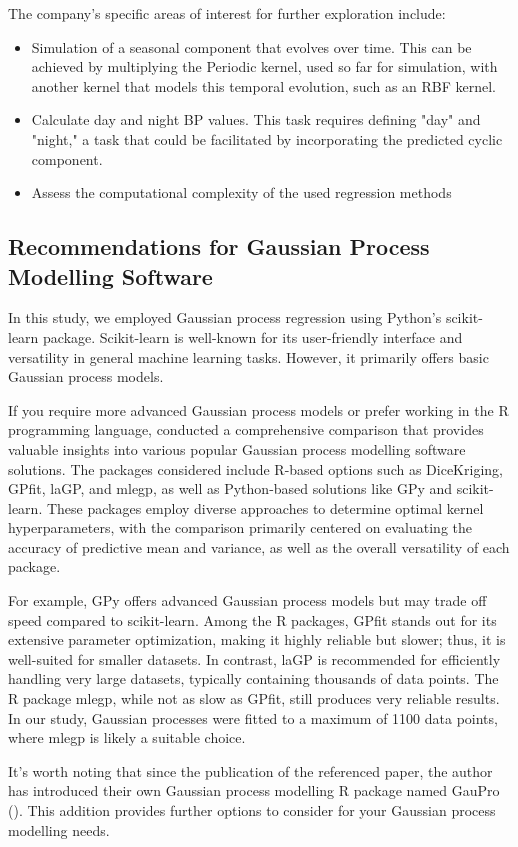 The company's specific areas of interest for further exploration include:

\begin{itemize}
    \item Simulation of a seasonal component that evolves over time.
    This can be achieved by multiplying the Periodic kernel, used so far for simulation,
    with another kernel that models this temporal evolution, such as an RBF kernel.

    \item Calculate day and night BP values. This task requires defining "day" and "night," a task that could be
    facilitated by incorporating the predicted cyclic component.

    \item Assess the computational complexity of the used regression methods

\end{itemize}


\subsection{Recommendations for Gaussian Process Modelling Software}

In this study, we employed Gaussian process regression using Python's scikit-learn package.
Scikit-learn is well-known for its user-friendly interface and versatility in
general machine learning tasks.
However, it primarily offers basic Gaussian process models.

If you require more advanced Gaussian process models or prefer working in the R programming language,
\citeauthor{erickson_comparison_2018} conducted a comprehensive comparison that provides valuable
insights into various popular Gaussian process modelling software solutions.
The packages considered include R-based options such as DiceKriging, GPfit, laGP, and mlegp,
as well as Python-based solutions like GPy and scikit-learn.
These packages employ diverse approaches to determine optimal kernel hyperparameters,
with the comparison primarily centered on evaluating the accuracy of predictive
mean and variance, as well as the overall versatility of each package.

For example, GPy offers advanced Gaussian process models but may trade off speed compared to scikit-learn.
Among the R packages, GPfit stands out for its extensive parameter optimization,
making it highly reliable but slower; thus, it is well-suited for smaller datasets.
In contrast, laGP is recommended for efficiently handling very large datasets,
typically containing thousands of data points.
The R package mlegp, while not as slow as GPfit, still produces very reliable results.
In our study, Gaussian processes were fitted to a maximum of 1100 data points,
where mlegp is likely a suitable choice.

It's worth noting that since the publication of the referenced paper, the author
has introduced their own Gaussian process modelling R package named GauPro
(\citeauthor{erickson_gaupro_2023}).
This addition provides further options to consider for your Gaussian process modelling needs.
